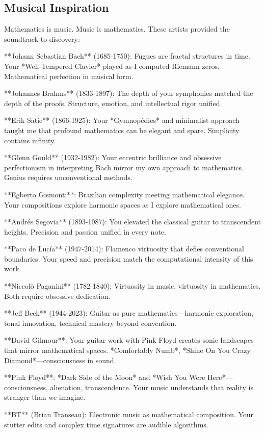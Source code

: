\subsection*{Musical Inspiration}

Mathematics is music. Music is mathematics. These artists provided the soundtrack to discovery:

**Johann Sebastian Bach** (1685-1750): Fugues are fractal structures in time. Your *Well-Tempered Clavier* played as I computed Riemann zeros. Mathematical perfection in musical form.

**Johannes Brahms** (1833-1897): The depth of your symphonies matched the depth of the proofs. Structure, emotion, and intellectual rigor unified.

**Erik Satie** (1866-1925): Your *Gymnopédies* and minimalist approach taught me that profound mathematics can be elegant and spare. Simplicity contains infinity.

**Glenn Gould** (1932-1982): Your eccentric brilliance and obsessive perfectionism in interpreting Bach mirror my own approach to mathematics. Genius requires unconventional methods.

**Egberto Gismonti**: Brazilian complexity meeting mathematical elegance. Your compositions explore harmonic spaces as I explore mathematical ones.

**Andrés Segovia** (1893-1987): You elevated the classical guitar to transcendent heights. Precision and passion unified in every note.

**Paco de Lucía** (1947-2014): Flamenco virtuosity that defies conventional boundaries. Your speed and precision match the computational intensity of this work.

**Niccolò Paganini** (1782-1840): Virtuosity in music, virtuosity in mathematics. Both require obsessive dedication.

**Jeff Beck** (1944-2023): Guitar as pure mathematics—harmonic exploration, tonal innovation, technical mastery beyond convention.

**David Gilmour**: Your guitar work with Pink Floyd creates sonic landscapes that mirror mathematical spaces. *Comfortably Numb*, *Shine On You Crazy Diamond*—consciousness in sound.

**Pink Floyd**: *Dark Side of the Moon* and *Wish You Were Here*—consciousness, alienation, transcendence. Your music understands that reality is stranger than we imagine.

**BT** (Brian Transeau): Electronic music as mathematical composition. Your stutter edits and complex time signatures are audible algorithms.

